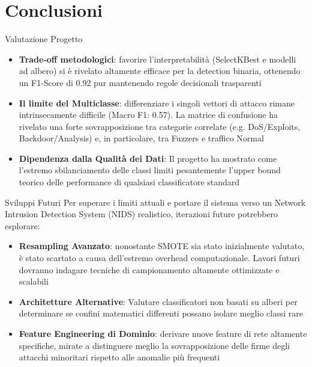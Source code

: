 \documentclass{beamer}
\begin{document}
\section{Conclusioni}

\begin{frame}{Valutazione Progetto}
  \begin{itemize}
    \item \textbf{Trade-off metodologici}: favorire l'interpretabilità 
      (SelectKBest e modelli ad albero) si è rivelato altamente efficace per la detection binaria, ottenendo un F1-Score di 0.92 pur mantenendo regole decisionali trasparenti
    \vspace{0.2cm}
    \item \textbf{Il limite del Multiclasse}: differenziare i singoli vettori di attacco rimane intrinsecamente difficile (Macro F1: 0.57). La matrice di confusione ha rivelato una forte sovrapposizione tra categorie correlate (e.g. DoS/Exploits, Backdoor/Analysis) e, in particolare, tra Fuzzers e traffico Normal
    \vspace{0.2cm}
    \item \textbf{Dipendenza dalla Qualità dei Dati}: Il progetto ha mostrato come l'estremo sbilanciamento delle classi limiti pesantemente l'upper bound teorico delle performance di qualsiasi classificatore standard
  \end{itemize}
\end{frame}

\begin{frame}{Sviluppi Futuri}
  Per superare i limiti attuali e portare il sistema verso un Network Intrusion Detection System (NIDS) realistico, iterazioni future potrebbero esplorare:
  
  \vspace{0.3cm}
  \begin{itemize}
    \item \textbf{Resampling Avanzato}: nonostante SMOTE sia stato inizialmente valutato, è stato scartato a causa dell'estremo overhead computazionale. Lavori futuri dovranno indagare tecniche di campionamento altamente ottimizzate e scalabili
    \vspace{0.2cm}
    \item \textbf{Architetture Alternative}: Valutare classificatori non basati su alberi per determinare se confini matematici differenti possano isolare meglio classi rare
    \vspace{0.2cm}
    \item \textbf{Feature Engineering di Dominio}: derivare nuove feature di rete altamente specifiche, mirate a distinguere meglio la sovrapposizione delle firme degli attacchi minoritari rispetto alle anomalie più frequenti
  \end{itemize}
\end{frame}
\end{document}
